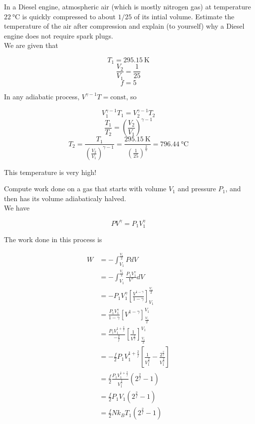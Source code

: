 \begin{texample}
	In a Diesel engine, atmospheric air (which is mostly nitrogen gas) at temperature $\SI{22}{\celsius}$ is quickly compressed to about $1/25$ of its intial volume. Estimate the temperature of the air after compression and explain (to yourself) why a Diesel engine does not require spark plugs. \\
	
	We are given that
	
	\[T_1=\SI{295.15}{\kelvin}\]
	\[\frac{V_2}{V_1}=\frac{1}{25}\]
	\[f=5\]
	
	In any adiabatic process, $V^{\gamma-1}T=\text{const}$, so
	
	\[V_1^{\gamma-1}T_1=V_2^{\gamma-1}T_2\]
	\[\frac{T_1}{T_2}=\left( \frac{V_2}{V_1} \right)^{\gamma-1}\]
	\[T_2=\frac{T_1}{\left( \frac{V_2}{V_1} \right)^{\gamma-1}}=\frac{\SI{295.15}{\kelvin}}{\left( \frac{1}{25} \right)^{\frac{2}{5}}}=\SI{796.44}{\celsius}\]
	
	This temperature is very high!
\end{texample}

\begin{texample}
	Compute work done on a gas that starts with volume $V_1$ and pressure $P_1$, and then has its volume adiabaticaly halved. \\
	
	We have
	
	\[PV^\gamma=P_1V_1^\gamma\]
	
	The work done in this process is
	
	\begin{align*}
		W&=-\int_{V_1}^\frac{V_1}{2} PdV \\
		&=-\int_{V_1}^\frac{V_1}{2} \frac{P_1V_1^\gamma}{V^\gamma} dV \\
		&=-P_1V_1^\gamma \left[ \frac{V^{1-\gamma}}{1-\gamma} \right]_{V_1}^{\frac{V_1}{2}} \\
		&=\frac{P_1V_1^\gamma}{1-\gamma} \left[ V^{1-\gamma} \right]_{\frac{V_1}{2}}^{V_1} \\
		&=\frac{P_1V_1^{1+\frac{2}{f}}}{-\frac{2}{f}} \left[ \frac{1}{V^{\frac{2}{f}}} \right]_{\frac{V_1}{2}}^{V_1} \\
		&=-\frac{f}{2} P_1V_1^{1+\frac{2}{f}} \left[ \frac{1}{V_1^\frac{2}{f}} - \frac{2^\frac{2}{f}}{V_1^\frac{2}{f}} \right] \\
		&=\frac{f}{2} \frac{P_1V_1^{1+\frac{2}{f}}}{V_1^\frac{2}{f}} \left( 2^\frac{2}{f} - 1 \right) \\
		&=\frac{f}{2} P_1V_1 \left( 2^\frac{2}{f} - 1 \right) \\
		&=\frac{f}{2} Nk_BT_1 \left( 2^\frac{2}{f} - 1 \right)
	\end{align*}
\end{texample}

